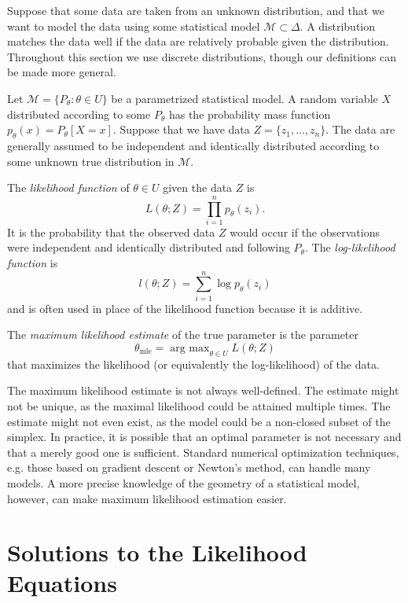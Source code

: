 \documentclass[cclicense]{hmcthesis}
\newcommand*{\Mod}{\mathcal{M}}
\newcommand*{\mle}{\theta_{\text{mle}}}
\DeclareMathOperator*{\argmax}{arg\ max}
\numberwithin{equation}{section}
\begin{document}
    Suppose that some data are taken from an unknown distribution, and that we
    want to model the data using some statistical model $\Mod \subset \Delta$.
    A distribution matches the data well if the data are relatively probable
    given the distribution.  Throughout this section we use discrete
    distributions, though our definitions can be made more general.

    Let $\Mod = \{P_\theta : \theta \in U\}$ be a parametrized statistical
    model. A random variable $X$ distributed according to some $P_\theta$ has
    the probability mass function $p_\theta(x) = P_\theta[X = x]$.  Suppose that
    we have data $Z = \{z_1, \ldots, z_n\}$.  The data are generally assumed to
    be independent and identically distributed according to some unknown true
    distribution in $\Mod$.
    
    \begin{definition}
    The \emph{likelihood function} of $\theta \in U$ given the data $Z$ is
    \[
        L(\theta; Z) = \prod_{i=1}^n p_\theta(z_i).
    \]
    It is the probability that the observed data $Z$ would occur if the
    observations were independent and identically distributed and following
    $P_\theta$.  The \emph{log-likelihood function} is
    \[
        l(\theta; Z) = \sum_{i=1}^n \log p_\theta(z_i)
    \]
    and is often used in place of the likelihood function because it is additive.
    \end{definition}
    \begin{definition}
    The \emph{maximum likelihood estimate} of the true parameter is the
    parameter 
    \[
        \mle = \argmax_{\theta \in U} L(\theta; Z)
    \]
    that maximizes the likelihood (or equivalently the log-likelihood) of the
    data.
    \end{definition}

    The maximum likelihood estimate is not always well-defined.  The estimate
    might not be unique, as the maximal likelihood could be attained multiple
    times.  The estimate  might not even exist, as the model could be a
    non-closed subset of the simplex.  In practice, it is possible that an
    optimal parameter is not necessary and that a merely good one is sufficient.
    Standard numerical optimization techniques, e.g. those based on gradient
    descent or Newton's method, can handle many models.  A more precise
    knowledge of the geometry of a statistical model, however, can make maximum
    likelihood estimation easier.

\section{Solutions to the Likelihood Equations}
\end{document}
